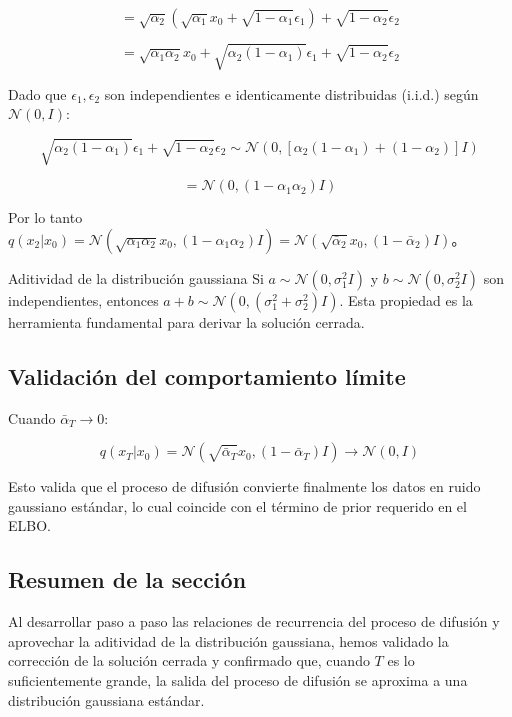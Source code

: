 \documentclass[a4paper]{article}
\begin{document}
$$= \sqrt{\alpha_2}(\sqrt{\alpha_1} x_0 + \sqrt{1-\alpha_1} \epsilon_1) + \sqrt{1-\alpha_2} \epsilon_2$$

$$= \sqrt{\alpha_1 \alpha_2} x_0 + \sqrt{\alpha_2(1-\alpha_1)} \epsilon_1 + \sqrt{1-\alpha_2} \epsilon_2$$

Dado que $\epsilon_1, \epsilon_2$ son independientes e identicamente distribuidas (i.i.d.) según $\mathcal{N}(0, I)$:

$$\sqrt{\alpha_2(1-\alpha_1)} \epsilon_1 + \sqrt{1-\alpha_2} \epsilon_2 \sim \mathcal{N}(0, [\alpha_2(1-\alpha_1) + (1-\alpha_2)] I)$$

$$= \mathcal{N}(0, (1 - \alpha_1 \alpha_2) I)$$

Por lo tanto $q(x_2 | x_0) = \mathcal{N}(\sqrt{\alpha_1 \alpha_2} x_0, (1 - \alpha_1 \alpha_2) I) = \mathcal{N}(\sqrt{\bar{\alpha}_2} x_0, (1-\bar{\alpha}_2) I)$。

\begin{knowledgebox}{Aditividad de la distribución gaussiana}
Si $a \sim \mathcal{N}(0, \sigma_1^2 I)$ y $b \sim \mathcal{N}(0, \sigma_2^2 I)$ son independientes, entonces $a + b \sim \mathcal{N}(0, (\sigma_1^2 + \sigma_2^2) I)$. Esta propiedad es la herramienta fundamental para derivar la solución cerrada.
\end{knowledgebox}

\subsection{Validación del comportamiento límite}

Cuando $\bar{\alpha}_T \to 0$:

$$q(x_T | x_0) = \mathcal{N}(\sqrt{\bar{\alpha}_T} x_0, (1-\bar{\alpha}_T)I) \to \mathcal{N}(0, I)$$

Esto valida que el proceso de difusión convierte finalmente los datos en ruido gaussiano estándar, lo cual coincide con el término de prior requerido en el ELBO.

\subsection{Resumen de la sección}

Al desarrollar paso a paso las relaciones de recurrencia del proceso de difusión y aprovechar la aditividad de la distribución gaussiana, hemos validado la corrección de la solución cerrada y confirmado que, cuando $T$ es lo suficientemente grande, la salida del proceso de difusión se aproxima a una distribución gaussiana estándar.
\end{document}
